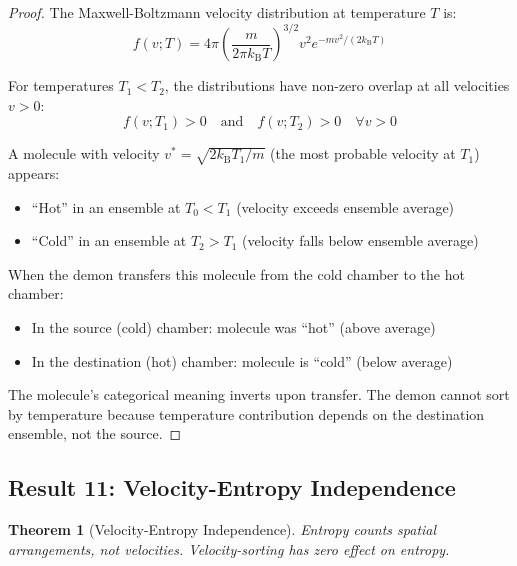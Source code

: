 \documentclass[twocolumn,showpacs,preprintnumbers,amsmath,amssymb,prd]{revtex4-2}
\newtheorem{theorem}{Theorem}[section]
\theoremstyle{definition}
\theoremstyle{remark}
\newcommand{\kB}{k_{\mathrm{B}}}
\begin{document}
\begin{proof}
The Maxwell-Boltzmann velocity distribution at temperature $T$ is:
\begin{equation}
f(v; T) = 4\pi \left(\frac{m}{2\pi \kB T}\right)^{3/2} v^2 e^{-mv^2/(2\kB T)}
\end{equation}

For temperatures $T_1 < T_2$, the distributions have non-zero overlap at all velocities $v > 0$:
\begin{equation}
f(v; T_1) > 0 \quad \text{and} \quad f(v; T_2) > 0 \quad \forall v > 0
\end{equation}

A molecule with velocity $v^* = \sqrt{2\kB T_1/m}$ (the most probable velocity at $T_1$) appears:
\begin{itemize}
\item ``Hot'' in an ensemble at $T_0 < T_1$ (velocity exceeds ensemble average)
\item ``Cold'' in an ensemble at $T_2 > T_1$ (velocity falls below ensemble average)
\end{itemize}

When the demon transfers this molecule from the cold chamber to the hot chamber:
\begin{itemize}
\item In the source (cold) chamber: molecule was ``hot'' (above average)
\item In the destination (hot) chamber: molecule is ``cold'' (below average)
\end{itemize}

The molecule's categorical meaning inverts upon transfer. The demon cannot sort by temperature because temperature contribution depends on the destination ensemble, not the source.
\end{proof}

\subsection{Result 11: Velocity-Entropy Independence}

\begin{theorem}[Velocity-Entropy Independence]
\label{thm:velocity_entropy}
Entropy counts spatial arrangements, not velocities. Velocity-sorting has zero effect on entropy.
\end{theorem}
\end{document}
